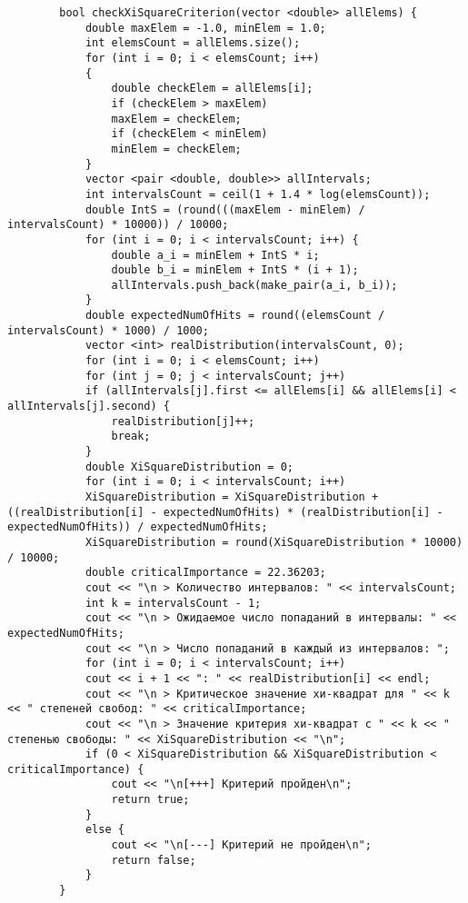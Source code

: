\documentclass[bachelor, och, coursework]{shiza}
\begin{document}
\begin{verbatim}
		bool checkXiSquareCriterion(vector <double> allElems) {
			double maxElem = -1.0, minElem = 1.0;
			int elemsCount = allElems.size();
			for (int i = 0; i < elemsCount; i++)
			{
				double checkElem = allElems[i];
				if (checkElem > maxElem)
				maxElem = checkElem;
				if (checkElem < minElem)
				minElem = checkElem;
			}
			vector <pair <double, double>> allIntervals;
			int intervalsCount = ceil(1 + 1.4 * log(elemsCount));
			double IntS = (round(((maxElem - minElem) / intervalsCount) * 10000)) / 10000;
			for (int i = 0; i < intervalsCount; i++) {
				double a_i = minElem + IntS * i;
				double b_i = minElem + IntS * (i + 1);
				allIntervals.push_back(make_pair(a_i, b_i));
			}
			double expectedNumOfHits = round((elemsCount / intervalsCount) * 1000) / 1000;
			vector <int> realDistribution(intervalsCount, 0);
			for (int i = 0; i < elemsCount; i++)
			for (int j = 0; j < intervalsCount; j++)
			if (allIntervals[j].first <= allElems[i] && allElems[i] < allIntervals[j].second) {
				realDistribution[j]++;
				break;
			}
			double XiSquareDistribution = 0;
			for (int i = 0; i < intervalsCount; i++)
			XiSquareDistribution = XiSquareDistribution + ((realDistribution[i] - expectedNumOfHits) * (realDistribution[i] - expectedNumOfHits)) / expectedNumOfHits;
			XiSquareDistribution = round(XiSquareDistribution * 10000) / 10000;
			double criticalImportance = 22.36203;
			cout << "\n > Количество интервалов: " << intervalsCount;
			int k = intervalsCount - 1;
			cout << "\n > Ожидаемое число попаданий в интервалы: " << expectedNumOfHits;
			cout << "\n > Число попаданий в каждый из интервалов: ";
			for (int i = 0; i < intervalsCount; i++)
			cout << i + 1 << ": " << realDistribution[i] << endl;
			cout << "\n > Критическое значение хи-квадрат для " << k << " степеней свобод: " << criticalImportance;
			cout << "\n > Значение критерия хи-квадрат с " << k << " степенью свободы: " << XiSquareDistribution << "\n";
			if (0 < XiSquareDistribution && XiSquareDistribution < criticalImportance) {
				cout << "\n[+++] Критерий пройден\n";
				return true;
			}
			else {
				cout << "\n[---] Критерий не пройден\n";
				return false;
			}
		}
		

\end{verbatim}
\end{document}
